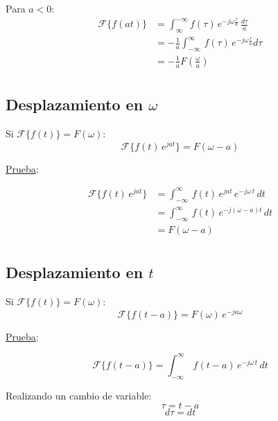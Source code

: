 Para $a<0$:
\begin{equation*}
\begin{split}
    \mathcal{F}\{f(at)\}
        &=\int_\infty^{-\infty}f(\tau)\,e^{-j\omega
            \frac{\tau}{a}}\,\frac{d\tau}{a}\\
        &=-\frac{1}{a}\int_{-\infty}^\infty\,f(\tau)\,e^{-j\omega
            \frac{\tau}{a}}d\tau\\
        &=-\frac{1}{a}F\left(\frac{\omega}{a}\right)\\
\end{split}
\end{equation*}

\subsection{Desplazamiento en $\omega$}
Si $\mathcal{F}\{f(t)\}=F(\omega)$:
\begin{equation}
    \mathcal{F}\{f(t)\,e^{jat}\}=F(\omega-a)
\end{equation}

\underline{Prueba}:

\begin{equation*}
\begin{split}
    \mathcal{F}\{f(t)\,e^{jat}\}
        &=\int_{-\infty}^\infty\,f(t)\,e^{jat}\,e^{-j\omega\,t}\,dt\\
        &=\int_{-\infty}^\infty\,f(t)\,e^{-j(\omega-a)t}\,dt\\
        &=F(\omega-a)\\
\end{split}
\end{equation*}

\subsection{Desplazamiento en $t$}
Si $\mathcal{F}\{f(t)\}=F(\omega)$:
\begin{equation}
    \mathcal{F}\{f(t-a)\}=F(\omega)\,e^{-ja\omega}
\end{equation}

\underline{Prueba}:

\begin{equation*}
    \mathcal{F}\{f(t-a)\}=\int_{-\infty}^\infty\,f(t-a)\,e^{-j\omega\,t}\,dt
\end{equation*}

Realizando un cambio de variable:
\begin{equation*}
    \tau=t-a
\end{equation*}
\begin{equation*}
    d\tau=dt
\end{equation*}

